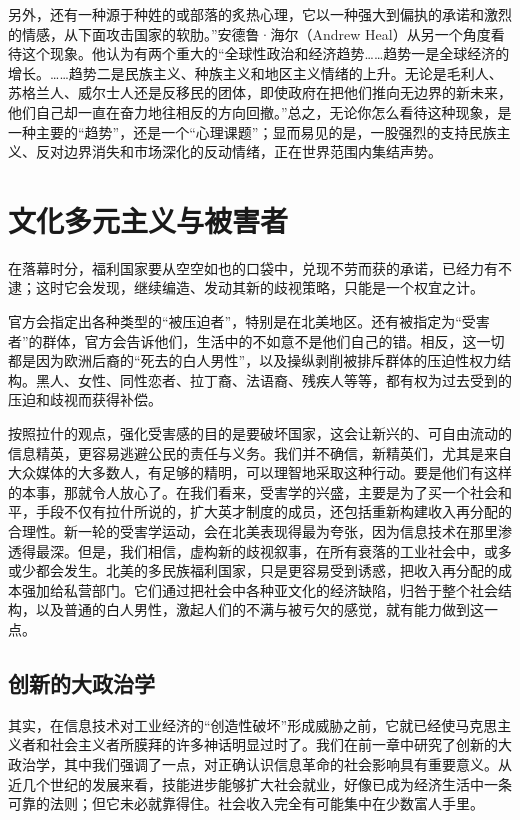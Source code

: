 另外，还有一种源于种姓的或部落的炙热心理，它以一种强大到偏执的承诺和激烈的情感，从下面攻击国家的软肋。”安德鲁·海尔（Andrew Heal）从另一个角度看待这个现象。他认为有两个重大的“全球性政治和经济趋势……趋势一是全球经济的增长。……趋势二是民族主义、种族主义和地区主义情绪的上升。无论是毛利人、苏格兰人、威尔士人还是反移民的团体，即使政府在把他们推向无边界的新未来，他们自己却一直在奋力地往相反的方向回撤。”总之，无论你怎么看待这种现象，是一种主要的“趋势”，还是一个“心理课题”；显而易见的是，一股强烈的支持民族主义、反对边界消失和市场深化的反动情绪，正在世界范围内集结声势。

\section{文化多元主义与被害者}
在落幕时分，福利国家要从空空如也的口袋中，兑现不劳而获的承诺，已经力有不逮；这时它会发现，继续编造、发动其新的歧视策略，只能是一个权宜之计。

官方会指定出各种类型的“被压迫者”，特别是在北美地区。还有被指定为“受害者”的群体，官方会告诉他们，生活中的不如意不是他们自己的错。相反，这一切都是因为欧洲后裔的“死去的白人男性”，以及操纵剥削被排斥群体的压迫性权力结构。黑人、女性、同性恋者、拉丁裔、法语裔、残疾人等等，都有权为过去受到的压迫和歧视而获得补偿。

按照拉什的观点，强化受害感的目的是要破坏国家，这会让新兴的、可自由流动的信息精英，更容易逃避公民的责任与义务。我们并不确信，新精英们，尤其是来自大众媒体的大多数人，有足够的精明，可以理智地采取这种行动。要是他们有这样的本事，那就令人放心了。在我们看来，受害学的兴盛，主要是为了买一个社会和平，手段不仅有拉什所说的，扩大英才制度的成员，还包括重新构建收入再分配的合理性。新一轮的受害学运动，会在北美表现得最为夸张，因为信息技术在那里渗透得最深。但是，我们相信，虚构新的歧视叙事，在所有衰落的工业社会中，或多或少都会发生。北美的多民族福利国家，只是更容易受到诱惑，把收入再分配的成本强加给私营部门。它们通过把社会中各种亚文化的经济缺陷，归咎于整个社会结构，以及普通的白人男性，激起人们的不满与被亏欠的感觉，就有能力做到这一点。

\subsection{创新的大政治学}
其实，在信息技术对工业经济的“创造性破坏”形成威胁之前，它就已经使马克思主义者和社会主义者所膜拜的许多神话明显过时了。我们在前一章中研究了创新的大政治学，其中我们强调了一点，对正确认识信息革命的社会影响具有重要意义。从近几个世纪的发展来看，技能进步能够扩大社会就业，好像已成为经济生活中一条可靠的法则；但它未必就靠得住。社会收入完全有可能集中在少数富人手里。

